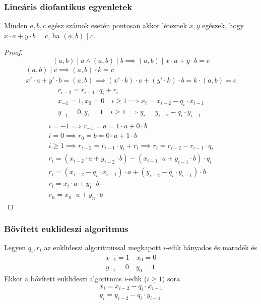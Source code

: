 \subsubsection{Lineáris diofantikus egyenletek}
\begin{theorem}
	Minden $a, b, c$ egész számok esetén
	pontosan akkor léteznek $x, y$ egészek, hogy $x \cdot a + y \cdot b = c$,
	ha $(a, b) \mid c$.
\end{theorem}
\begin{proof}
	\begin{equation*}
		(a, b) \mid a \land (a, b) \mid b \implies
		(a, b) \mid x \cdot a + y \cdot b = c
	\end{equation*}
	\begin{gather*}
		(a, b) \mid c \implies (a, b) \cdot k = c \\
		x' \cdot a + y' \cdot b = (a, b) \implies
		(x' \cdot k) \cdot a + (y' \cdot k) \cdot b = k \cdot (a, b) = c
	\end{gather*}
	\begin{gather*}
		r_{i - 2} = r_{i - 1} \cdot q_i + r_i \\
		x_{-1} = 1, x_0 = 0 \quad i \geq 1 \implies
		x_i = x_{i - 2} - q_i \cdot x_{i - 1} \\
		y_{-1} = 0, y_1 = 1 \quad i \geq 1 \implies
		y_i = y_{i - 2} - q_i \cdot y_{i - 1} \\
	\end{gather*}
	\begin{gather*}
		i = -1 \implies r_{-1} = a = 1 \cdot a + 0 \cdot b \\
		i = 0 \implies r_0 = b = 0 \cdot a + 1 \cdot b \\
		i \geq 1 \implies r_{i - 2} = r_{i - 1} \cdot q_i + r_i \implies
		r_i = r_{i - 2} - r_{i - 1} \cdot q_i \\
		r_i = \left( x_{i - 2} \cdot a + y_{i - 2} \cdot b \right) -
		\left( x_{i - 1} \cdot a + y_{i - 1} \cdot b \right) \cdot q_i \\
		r_i = \left( x_{i - 2} - q_i \cdot x_{i - 1} \right) \cdot a +
		\left( y_{i - 2} - q_i \cdot y_{i - 1} \right) \cdot b \\
		r_i = x_i \cdot a + y_i \cdot b \\
		r_n = x_n \cdot a + y_n \cdot b
	\end{gather*}
\end{proof}
\subsubsection{Bővített euklideszi algoritmus}
\begin{definition}
	Legyen $q_i, r_i$ az euklideszi algoritmussal megkapott
	$i$-edik hányados és maradék és
	\begin{gather*}
		x_{-1} = 1 \quad x_0 = 0 \\
		y_{-1} = 0 \quad y_0 = 1
	\end{gather*}
	Ekkor a bővített euklideszi algoritmus $i$-edik ($i \geq 1$) sora
	\begin{gather*}
		x_i = x_{i - 2} - q_i \cdot x_{i - 1} \\
		y_i = y_{i - 2} - q_i \cdot y_{i - 1}
	\end{gather*}
\end{definition}
